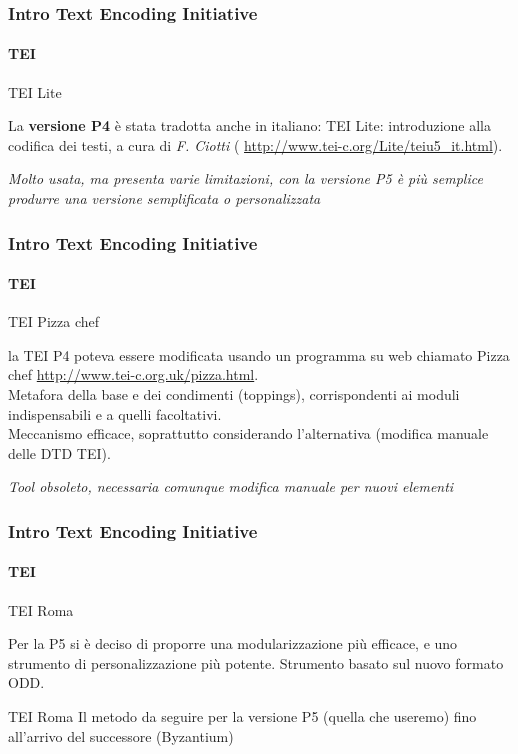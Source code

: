 \begin{frame}
	\frametitle{Intro Text Encoding Initiative}
	\framesubtitle{TEI}
	\addtocounter{nframe}{1}

	\begin{block}{TEI Lite}

		La \textbf{versione P4} è stata tradotta anche in italiano: TEI Lite:
		introduzione alla codifica dei testi, a cura di \textit{F. Ciotti} (
		\url{http://www.tei-c.org/Lite/teiu5_it.html}).
    \end{block}
    \textit{Molto usata, ma presenta varie limitazioni, con la versione P5 è più semplice produrre una versione semplificata o personalizzata}
\end{frame}

\begin{frame}
	\frametitle{Intro Text Encoding Initiative}
	\framesubtitle{TEI}
	\addtocounter{nframe}{1}

	\begin{block}{TEI Pizza chef}

		la TEI P4 poteva essere modificata usando un programma su
		web chiamato Pizza chef
		\url{http://www.tei-c.org.uk/pizza.html}.
		\\Metafora della base e dei condimenti (toppings),
		corrispondenti ai moduli indispensabili e a quelli facoltativi.
		\\Meccanismo efficace, soprattutto considerando l’alternativa
		(modifica manuale delle DTD TEI).
    \end{block}
    
    \textit{Tool obsoleto, necessaria comunque modifica manuale per nuovi elementi}


\end{frame}

\begin{frame}
	\frametitle{Intro Text Encoding Initiative}
	\framesubtitle{TEI}
	\addtocounter{nframe}{1}

	\begin{block}{TEI Roma}

		Per la P5 si è deciso di proporre una modularizzazione più
		efficace, e uno strumento di personalizzazione più potente.
		Strumento basato sul nuovo formato ODD.


	\end{block}

	\begin{block}{TEI Roma}
		Il metodo da seguire per la versione P5 (quella che
		useremo) fino all’arrivo del successore (Byzantium)

	\end{block}

\end{frame}

